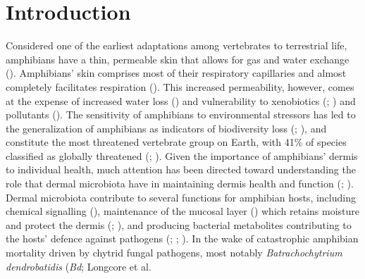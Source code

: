 \documentclass[
  12pt,
]{article}
\begin{document}
\section{Introduction}\label{introduction}

Considered one of the earliest adaptations among vertebrates to
terrestrial life, amphibians have a thin, permeable skin that allows for
gas and water exchange (). Amphibians' skin comprises most of their
respiratory capillaries and almost completely facilitates respiration
(). This increased
permeability, however, comes at the expense of increased water loss
() and
vulnerability to xenobiotics
(;
) and pollutants
(). The
sensitivity of amphibians to environmental stressors has led to the
generalization of amphibians as indicators of biodiversity loss
(;
), and constitute the most
threatened vertebrate group on Earth, with 41\% of species classified as
globally threatened (;
). Given the
importance of amphibians' dermis to individual health, much attention
has been directed toward understanding the role that dermal microbiota
have in maintaining dermis health and function
(; ). Dermal microbiota
contribute to several functions for amphibian hosts, including chemical
signalling (), maintenance of the mucosal layer
() which
retains moisture and protect the dermis
(;
), and producing
bacterial metabolites contributing to the hosts' defence against
pathogens (; ;
). In the wake of catastrophic amphibian mortality driven by
chytrid fungal pathogens, most notably \emph{Batrachochytrium
dendrobatidis} (\emph{Bd}; Longcore et al.
\end{document}
